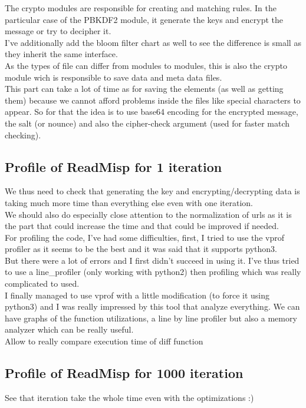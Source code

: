 \documentclass{eplmastersthesis}
\begin{document}
The crypto modules are responsible for creating and matching rules. In the particular case of the PBKDF2 module, it generate the keys and encrypt the message or try to decipher it.\\
I've additionally add the bloom filter chart as well to see the difference is small as they inherit the same interface.\\

As the types of file can differ from modules to modules, this is also the crypto module wich is responsible to save data and meta data files.\\
This part can take a lot of time as for saving the elements (as well as getting them) because we cannot afford problems inside the files like special characters to appear. So for that the idea is to use base64 encoding for the encrypted message, the salt (or nounce) and also the cipher-check argument (used for faster match checking).\\


\subsection{Profile of ReadMisp for 1 iteration}
We thus need to check that generating the key and encrypting/decrypting data is taking much more time than everything else even with one iteration.\\
We should also do especially close attention to the normalization of urls as it is the part that could increase the time and that could be improved if needed.\\
For profiling the code, I've had some difficulties, first, I tried to use the vprof profiler as it seems to be the best and it was said that it supports python3.\\
But there were a lot of errors and I first didn't succeed in using it. I've thus tried to use a line\_profiler (only working with python2) then profiling which was really complicated to used. \\
I finally managed to use vprof with a little modification (to force it using python3) and I was really impressed by this tool that analyze everything. We can have graphs of the function utilizations, a line by line profiler but also a memory analyzer which can be really useful.\\

Allow to really compare execution time of diff function

\subsection{Profile of ReadMisp for 1000 iteration}
See that iteration take the whole time even with the optimizations :) 
\end{document}
